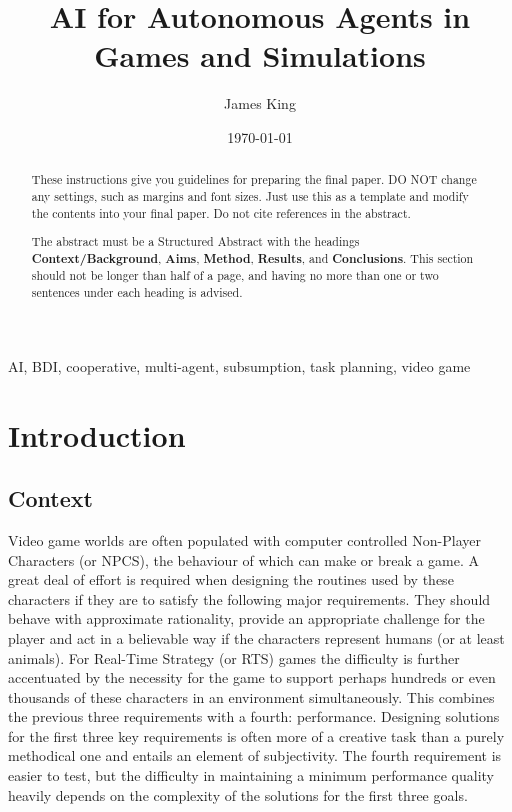 \documentclass[12pt,a4paper]{article}
\title{AI for Autonomous Agents in Games and Simulations}
\author{James King}
\date{\today}
\begin{document}
\maketitle

\begin{abstract}
These instructions give you guidelines for preparing the final paper.  DO NOT change any settings, such as margins and font sizes.  Just use this as a template and modify the contents into your final paper.  Do not cite references in the abstract.

The abstract must be a Structured Abstract with the headings {\bf Context/Background}, {\bf Aims}, {\bf Method}, {\bf Results}, and {\bf Conclusions}.  This section should not be longer than half of a page, and having no more than one or two sentences under each heading is advised.
\end{abstract}

\begin{keywords}
AI, BDI, cooperative, multi-agent, subsumption, task planning, video game
\end{keywords}

\section{Introduction}
\subsection{Context}\noindent
Video game worlds are often populated with computer controlled Non-Player Characters (or NPCS), the behaviour of which can make or break a game. A great deal of effort is required when designing the routines used by these characters if they are to satisfy the following major requirements. They should behave with approximate rationality, provide an appropriate challenge for the player and act in a believable way if the characters represent humans (or at least animals). For Real-Time Strategy (or RTS) games the difficulty is further accentuated by the necessity for the game to support perhaps hundreds or even thousands of these characters in an environment simultaneously. This combines the previous three requirements with a fourth: performance. Designing solutions for the first three key requirements is often more of a creative task than a purely methodical one and entails an element of subjectivity. The fourth requirement is easier to test, but the difficulty in maintaining a minimum performance quality heavily depends on the complexity of the solutions for the first three goals.
\end{document}

